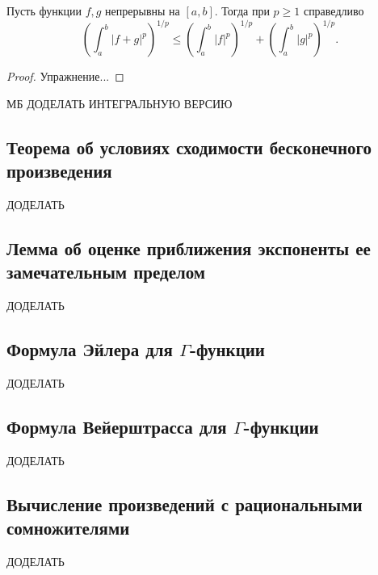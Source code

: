 \begin{ntheorem}
	Пусть функции \(f, g\) непрерывны на \([a, b]\). Тогда при \(p \geqslant 1\) справедливо \[
		\left(\int_a^b |f + g|^p \right)^{1/p} \leqslant \left(\int_a^b |f|^p \right)^{1/p} + \left(\int_a^b |g|^p \right)^{1/p}.
	\]
\end{ntheorem}
\begin{proof}
	Упражнение...
\end{proof}

МБ ДОДЕЛАТЬ ИНТЕГРАЛЬНУЮ ВЕРСИЮ

\subsection{Теорема об условиях сходимости бесконечного произведения}

ДОДЕЛАТЬ

\subsection{Лемма об оценке приближения экспоненты ее замечательным пределом}

ДОДЕЛАТЬ

\subsection{Формула Эйлера для \(\Gamma\)-функции}

ДОДЕЛАТЬ

\subsection{Формула Вейерштрасса для \(\Gamma\)-функции}

ДОДЕЛАТЬ

\subsection{Вычисление произведений с рациональными сомножителями}

ДОДЕЛАТЬ
